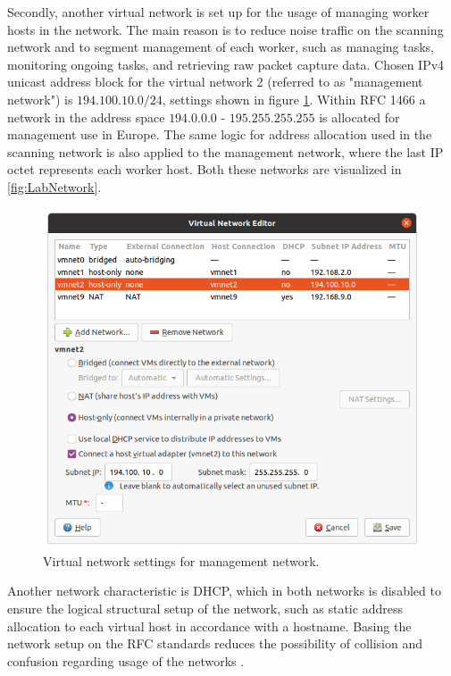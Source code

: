 Secondly, another virtual network is set up for the usage of managing worker hosts in the network.
The main reason is to reduce noise traffic on the scanning network and to segment management of each worker, such as managing tasks, monitoring ongoing tasks, and retrieving raw packet capture data.
Chosen IPv4 unicast address block for the virtual network 2 (referred to as "management network") is $194.100.10.0/24$, settings shown in figure \ref{fig:VirtNetworkManagement}.
Within RFC 1466 \autocite{rfc1466} a network in the address space $194.0.0.0$ - $195.255.255.255$ is allocated for management use in Europe. The same logic for address allocation used in the scanning network is also applied to the management network, where the last IP octet represents each worker host. Both these networks are visualized in \ref{fig:LabNetwork}.
\begin{figure}[htbp]
\centerline{\includegraphics[scale=0.4]{images/lab/vmnet2.png}}
\caption{Virtual network settings for management network.}
\label{fig:VirtNetworkManagement}
\end{figure}
Another network characteristic is DHCP, which in both networks is disabled to ensure the logical structural setup of the network, such as static address allocation to each virtual host in accordance with a hostname.
Basing the network setup on the RFC standards reduces the possibility of collision and confusion regarding usage of the networks \autocite{rfc1466,rfc5737}.

